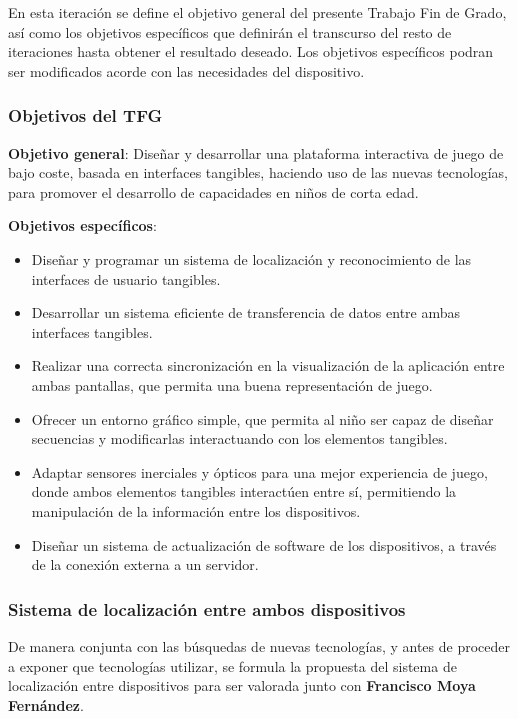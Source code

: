 En esta iteración se define el objetivo general del presente Trabajo Fin de Grado, así como los objetivos específicos que definirán el transcurso del resto de iteraciones hasta obtener el resultado deseado. Los objetivos específicos podran ser modificados acorde con las necesidades del dispositivo.

\subsubsection{Objetivos del TFG}

\textbf{Objetivo general}: Diseñar y desarrollar una plataforma interactiva de juego de bajo coste, basada en interfaces tangibles, haciendo uso de las nuevas tecnologías, para promover el desarrollo de capacidades en niños de corta edad.

\textbf{Objetivos específicos}:
\begin{itemize}
\item Diseñar y programar un sistema de localización y reconocimiento de las interfaces de usuario tangibles.

\item Desarrollar un sistema eficiente de transferencia de datos entre ambas interfaces tangibles.

\item Realizar una correcta sincronización en la visualización de la aplicación entre ambas pantallas, que permita una buena representación de juego.

\item Ofrecer un entorno gráfico simple, que permita al niño ser capaz de diseñar secuencias y modificarlas interactuando con los elementos tangibles.

\item Adaptar sensores inerciales y ópticos para una mejor experiencia de juego, donde ambos elementos tangibles interactúen entre sí, permitiendo la manipulación de la información entre los dispositivos.

\item Diseñar un sistema de actualización de software de los dispositivos, a través de la conexión externa a un servidor.
\end{itemize}

\subsubsection{Sistema de localización entre ambos dispositivos}
De manera conjunta con las búsquedas de nuevas tecnologías, y antes de proceder a exponer que tecnologías utilizar, se formula la propuesta del sistema de localización entre dispositivos para ser valorada junto con \textbf{Francisco Moya Fernández}.
 
